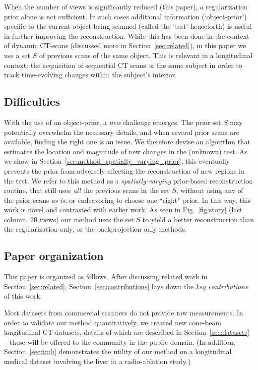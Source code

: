\documentclass[journal]{IEEEtran}
\begin{document}
  When the number of views is significantly reduced (this paper), a
 regularization prior alone is not sufficient.  In such cases
 additional information (`object-prior') specific to the current
 object being scanned (called the `test' henceforth) is useful in
 further improving the reconstruction.  While this has been done in
 the context of dynamic CT-scans (discussed more in
 Section~\ref{sec:related}), in this paper we use a set $S$ of
 previous scans of the same object. This is relevant in a longitudinal
 context: the acquisition of sequential CT scans of the same subject
 in order to track time-evolving changes within the subject's
 interior. 
 \subsection{Difficulties}
 
 With the use of an object-prior, a \emph{new} challenge emerges. The prior
 set $S$ may potentially overwhelm the necessary details, and when
 several prior scans are available, finding the right one is an
 issue. We therefore devise an algorithm that estimates the location
 and magnitude of new changes in the (unknown) test. As we show in
 Section~\ref{sec:method_spatially_varying_prior}, this eventually
 prevents the prior from adversely affecting the reconstruction of new
 regions in the test. We refer to this method as a
 \textit{spatially-varying} prior-based reconstruction routine, that
 still uses \textit{all} the previous scans in the set $S$, without
 using any of the prior scans \textit{as is}, or endeavoring to choose
 one ``right'' prior. In this way, this work is novel and contrasted
 with earlier work. As seen in Fig.~\ref{fig:story} (last column, 20
 views) our method uses the set $S$ to yield a better reconstruction
 than the regularization-only, or the backprojection-only methods.

 \subsection{Paper organization}
 This paper is organized as follows. After discussing related work in
 Section~\ref{sec:related}, Section~\ref{sec:contributions} lays down
 the \emph{key contributions} of this work.
 
Most datasets from commercial scanners do not provide raw
measurements. In order to validate our method quantitatively, we
created new cone-beam longitudinal CT datasets, details of which are
described in Section~\ref{sec:datasets} -- these will be offered to
the community in the public domain.  (In addition,
Section~\ref{sec:tmh} demonstrates the utility of our method on a
longitudinal medical dataset involving the liver in a radio-ablation
study.)
 
\end{document}
